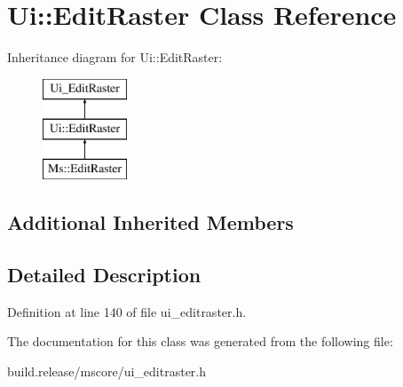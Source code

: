 \hypertarget{class_ui_1_1_edit_raster}{}\section{Ui\+:\+:Edit\+Raster Class Reference}
\label{class_ui_1_1_edit_raster}
Inheritance diagram for Ui\+:\+:Edit\+Raster\+:\begin{figure}[H]
\begin{center}
\leavevmode
\includegraphics[height=3.000000cm]{class_ui_1_1_edit_raster}
\end{center}
\end{figure}
\subsection*{Additional Inherited Members}


\subsection{Detailed Description}


Definition at line 140 of file ui\+\_\+editraster.\+h.



The documentation for this class was generated from the following file\+:\begin{DoxyCompactItemize}
\item 
build.\+release/mscore/ui\+\_\+editraster.\+h\end{DoxyCompactItemize}
